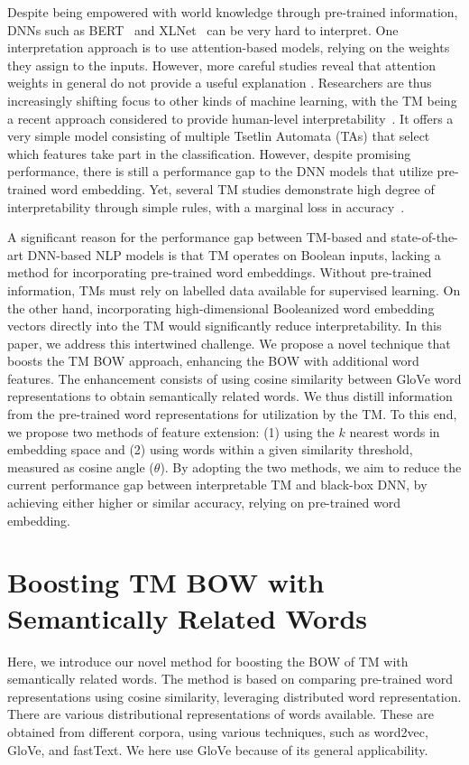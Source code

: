 \documentclass[11pt]{article}
\begin{document}
\par Despite being empowered with world knowledge through pre-trained information, DNNs such as BERT~\cite{devlinbert} and XLNet~\cite{NEURIPS2019_dc6a7e65} can be very hard to interpret. One interpretation approach is to use attention-based models,  relying on the weights they assign to the inputs. However, more careful studies reveal that attention weights in general do not provide a useful explanation \cite{Bai2020WhyIA, serrano-attention}. Researchers are thus increasingly shifting focus to other kinds of machine learning, with the TM being a recent approach considered to provide human-level interpretability~\cite{Berge2019UsingTT, Granmo2018TheTM, yadav2021sentiment}. It offers a very simple model consisting of multiple Tsetlin Automata (TAs) that select which features take part in the classification. However, despite promising performance, there is still a performance gap to the DNN models that utilize pre-trained word embedding. Yet, several TM studies demonstrate high degree of interpretability through simple rules, with a marginal loss in accuracy~\cite{yadav2021sentiment, icaart21rohan, rupsa2020sentiment}.

A significant reason for the performance gap between TM-based and state-of-the-art DNN-based NLP models is that TM operates on Boolean inputs, lacking a method for incorporating pre-trained word embeddings. Without pre-trained information, TMs must rely on labelled data available for supervised learning. On the other hand, incorporating high-dimensional Booleanized word embedding vectors directly into the TM would significantly reduce interpretability. In this paper, we address this intertwined challenge.  We propose a novel technique that boosts the TM BOW approach, enhancing the BOW with additional word features. The enhancement consists of using cosine similarity between GloVe word representations to obtain semantically related words. We thus distill information from the pre-trained word representations for utilization by the TM. To this end, we propose two methods of feature extension: (1) using the $k$ nearest words in embedding space and (2) using words within a given similarity threshold, measured as cosine angle ($\theta$).  By adopting the two methods, we aim to reduce the current performance gap between interpretable TM and black-box DNN, by achieving either higher or similar accuracy, relying on pre-trained word embedding.


\section{Boosting TM BOW with Semantically Related Words} \label{model}
Here, we introduce our novel method for boosting the BOW of TM with semantically related words. The method is based on comparing pre-trained word representations using cosine similarity, leveraging distributed word representation. There are various distributional representations of words available. These are obtained from different corpora, using various techniques, such as word2vec, GloVe, and fastText. We here use GloVe because of its general applicability.
\end{document}
